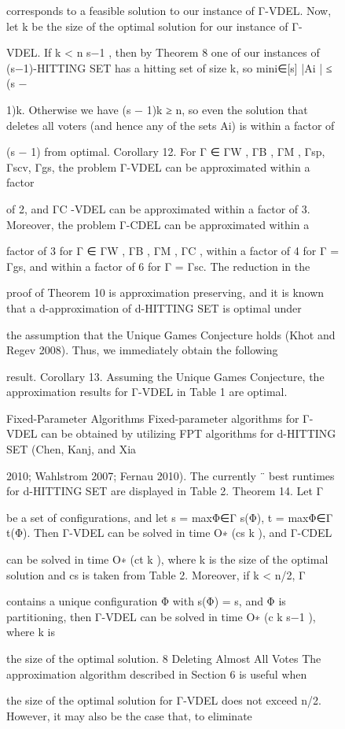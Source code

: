 \documentclass[12pt, a4paper]{report}
\begin{document}
\begin{figure}[ht!]
corresponds to a feasible solution to our instance of Γ-VDEL. Now, let k be the size of the optimal solution for our instance of Γ- 

VDEL. If k < n s−1 , then by Theorem 8 one of our instances of (s−1)-HITTING SET has a hitting set of size k, so mini∈[s] |Ai | ≤ (s − 

1)k. Otherwise we have (s − 1)k ≥ n, so even the solution that deletes all voters (and hence any of the sets Ai) is within a factor of 

(s − 1) from optimal. Corollary 12. For Γ ∈ {ΓW , ΓB , ΓM , Γsp, Γscv, Γgs}, the problem Γ-VDEL can be approximated within a factor 

of 2, and ΓC -VDEL can be approximated within a factor of 3. Moreover, the problem Γ-CDEL can be approximated within a 

factor of 3 for Γ ∈ {ΓW , ΓB , ΓM , ΓC }, within a factor of 4 for Γ = Γgs, and within a factor of 6 for Γ = Γsc. The reduction in the 

proof of Theorem 10 is approximation preserving, and it is known that a d-approximation of d-HITTING SET is optimal under 

the assumption that the Unique Games Conjecture holds (Khot and Regev 2008). Thus, we immediately obtain the following 

result. Corollary 13. Assuming the Unique Games Conjecture, the approximation results for Γ-VDEL in Table 1 are optimal.

Fixed-Parameter Algorithms 
Fixed-parameter algorithms for Γ-VDEL can be obtained by utilizing FPT algorithms for d-HITTING SET (Chen, Kanj, and Xia 

2010; Wahlstrom 2007; Fernau 2010). The currently ¨ best runtimes for d-HITTING SET are displayed in Table 2. Theorem 14. Let Γ 

be a set of configurations, and let s = maxΦ∈Γ s(Φ), t = maxΦ∈Γ t(Φ). Then Γ-VDEL can be solved in time O∗ (cs k ), and Γ-CDEL 

can be solved in time O∗ (ct k ), where k is the size of the optimal solution and cs is taken from Table 2. Moreover, if k < n/2, Γ 

contains a unique configuration Φ with s(Φ) = s, and Φ is partitioning, then Γ-VDEL can be solved in time O∗ (c k s−1 ), where k is 

the size of the optimal solution. 8 Deleting Almost All Votes The approximation algorithm described in Section 6 is useful when 

the size of the optimal solution for Γ-VDEL does not exceed n/2. However, it may also be the case that, to eliminate 


\end{figure}
\end{document}
